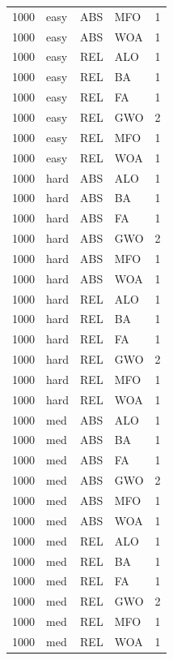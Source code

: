 \begin{tabular}{r l l l l}
1000 & easy & ABS & MFO & 1 \\
1000 & easy & ABS & WOA & 1 \\
1000 & easy & REL & ALO & 1 \\
1000 & easy & REL & BA & 1 \\
1000 & easy & REL & FA & 1 \\
1000 & easy & REL & GWO & 2 \\
1000 & easy & REL & MFO & 1 \\
1000 & easy & REL & WOA & 1 \\
1000 & hard & ABS & ALO & 1 \\
1000 & hard & ABS & BA & 1 \\
1000 & hard & ABS & FA & 1 \\
1000 & hard & ABS & GWO & 2 \\
1000 & hard & ABS & MFO & 1 \\
1000 & hard & ABS & WOA & 1 \\
1000 & hard & REL & ALO & 1 \\
1000 & hard & REL & BA & 1 \\
1000 & hard & REL & FA & 1 \\
1000 & hard & REL & GWO & 2 \\
1000 & hard & REL & MFO & 1 \\
1000 & hard & REL & WOA & 1 \\
1000 & med & ABS & ALO & 1 \\
1000 & med & ABS & BA & 1 \\
1000 & med & ABS & FA & 1 \\
1000 & med & ABS & GWO & 2 \\
1000 & med & ABS & MFO & 1 \\
1000 & med & ABS & WOA & 1 \\
1000 & med & REL & ALO & 1 \\
1000 & med & REL & BA & 1 \\
1000 & med & REL & FA & 1 \\
1000 & med & REL & GWO & 2 \\
1000 & med & REL & MFO & 1 \\
1000 & med & REL & WOA & 1 \\
\hline
\end{tabular}